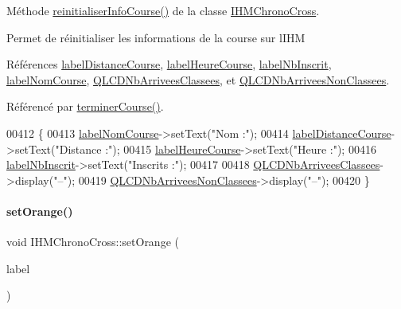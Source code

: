 Méthode \hyperlink{class_i_h_m_chrono_cross_a1149f4f57c8cf34048f93fba6b4176b3}{reinitialiser\+Info\+Course()} de la classe \hyperlink{class_i_h_m_chrono_cross}{I\+H\+M\+Chrono\+Cross}. 

Permet de réinitialiser les informations de la course sur l\textquotesingle{}I\+HM 

Références \hyperlink{class_i_h_m_chrono_cross_a4748740a4973bf62c408be380ac0ae77}{label\+Distance\+Course}, \hyperlink{class_i_h_m_chrono_cross_ad071b8c6ecc126fca3e17e58e83942d9}{label\+Heure\+Course}, \hyperlink{class_i_h_m_chrono_cross_a9d410e8bc161481a83298176b2702519}{label\+Nb\+Inscrit}, \hyperlink{class_i_h_m_chrono_cross_aebe86f4e614f568db5558bf99f1b44e6}{label\+Nom\+Course}, \hyperlink{class_i_h_m_chrono_cross_aeba189eacad7e19e009ae4764f98b9be}{Q\+L\+C\+D\+Nb\+Arrivees\+Classees}, et \hyperlink{class_i_h_m_chrono_cross_a9cf1b999b13e69fdd0fb11ddb9011ed5}{Q\+L\+C\+D\+Nb\+Arrivees\+Non\+Classees}.



Référencé par \hyperlink{class_i_h_m_chrono_cross_ac89c6ec3040e8b787f1fbdb670405023}{terminer\+Course()}.


\begin{DoxyCode}
00412 \{
00413     \hyperlink{class_i_h_m_chrono_cross_aebe86f4e614f568db5558bf99f1b44e6}{labelNomCourse}->setText(\textcolor{stringliteral}{"Nom :"});
00414     \hyperlink{class_i_h_m_chrono_cross_a4748740a4973bf62c408be380ac0ae77}{labelDistanceCourse}->setText(\textcolor{stringliteral}{"Distance :"});
00415     \hyperlink{class_i_h_m_chrono_cross_ad071b8c6ecc126fca3e17e58e83942d9}{labelHeureCourse}->setText(\textcolor{stringliteral}{"Heure :"});
00416     \hyperlink{class_i_h_m_chrono_cross_a9d410e8bc161481a83298176b2702519}{labelNbInscrit}->setText(\textcolor{stringliteral}{"Inscrits :"});
00417 
00418     \hyperlink{class_i_h_m_chrono_cross_aeba189eacad7e19e009ae4764f98b9be}{QLCDNbArriveesClassees}->display(\textcolor{stringliteral}{"--"});
00419     \hyperlink{class_i_h_m_chrono_cross_a9cf1b999b13e69fdd0fb11ddb9011ed5}{QLCDNbArriveesNonClassees}->display(\textcolor{stringliteral}{"--"});
00420 \}
\end{DoxyCode}
\mbox{\label{class_i_h_m_chrono_cross_a7e2424925f588d7a1914befc3c6c832e}} 
\paragraph{\texorpdfstring{set\+Orange()}{setOrange()}}
{\footnotesize\ttfamily void I\+H\+M\+Chrono\+Cross\+::set\+Orange (\begin{DoxyParamCaption}\item[{Q\+Label $\ast$}]{label }\end{DoxyParamCaption})\hspace{0.3cm}{\ttfamily [private]}}



